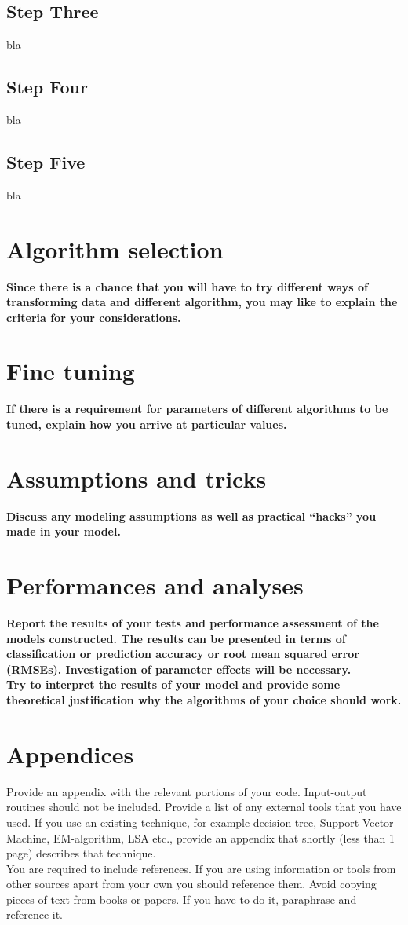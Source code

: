 \documentclass{article}
\begin{document}
\subsection{Step Three}
bla
\subsection{Step Four}
bla
\subsection{Step Five}
bla

\section{Algorithm selection}
\noindent
\textbf{Since there is a chance that you will have to try different ways of transforming data and different algorithm, you may like to explain the criteria for your considerations.}\\


\section{Fine tuning}
\noindent
\textbf{If there is a requirement for parameters of different algorithms to be tuned, explain how you arrive at particular values.}


\section{Assumptions and tricks}
\noindent
\textbf{Discuss any modeling assumptions as well as practical “hacks” you made in your model.}

\section{Performances and analyses}
\noindent
\textbf{Report the results of your tests and performance assessment of the models constructed. The results can be presented in terms of classification or prediction accuracy or root mean squared error (RMSEs). Investigation of parameter effects will be necessary.} \\

\noindent
\textbf{Try to interpret the results of your model and provide some theoretical justification why the algorithms of your choice should work.}

\section{Appendices}
Provide an appendix with the relevant portions of your code. Input-output
routines should not be included. Provide a list of any external tools that you have used. If you use an existing technique, for example decision tree, Support Vector Machine, EM-algorithm, LSA etc., provide an appendix that shortly (less than 1 page) describes that technique.\\

\noindent
You are required to include references. If you are using information or tools from other sources apart from your own you should reference them. Avoid copying pieces of text from books or papers. If you have to do it, paraphrase and reference it.


\printbibliography
\end{document}
